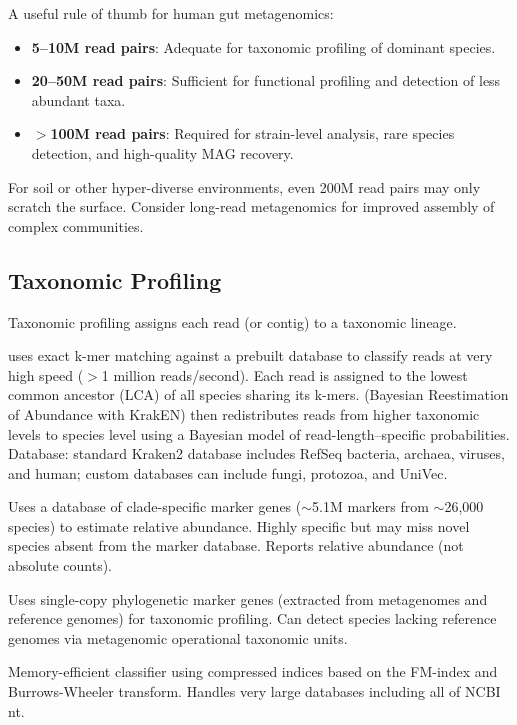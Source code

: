 \begin{tipbox}[title={Estimating Required Sequencing Depth}]
A useful rule of thumb for human gut metagenomics:
\begin{itemize}[nosep]
  \item \textbf{5--10M read pairs}: Adequate for taxonomic profiling of dominant species.
  \item \textbf{20--50M read pairs}: Sufficient for functional profiling and detection of less abundant taxa.
  \item \textbf{$>$100M read pairs}: Required for strain-level analysis, rare species detection, and high-quality MAG recovery.
\end{itemize}
For soil or other hyper-diverse environments, even 200M read pairs may only scratch the surface. Consider long-read metagenomics for improved assembly of complex communities.
\end{tipbox}

\subsection{Taxonomic Profiling}

Taxonomic profiling assigns each read (or contig) to a taxonomic lineage.

\begin{description}[style=nextline]
  \item[Kraken2 / Bracken]  uses exact k-mer matching against a prebuilt database to classify reads at very high speed ($>$1 million reads/second). Each read is assigned to the lowest common ancestor (LCA) of all species sharing its k-mers.  (Bayesian Reestimation of Abundance with KrakEN) then redistributes reads from higher taxonomic levels to species level using a Bayesian model of read-length--specific probabilities. Database: standard Kraken2 database includes RefSeq bacteria, archaea, viruses, and human; custom databases can include fungi, protozoa, and UniVec.
  \item[MetaPhlAn 4] Uses a database of clade-specific marker genes ($\sim$5.1M markers from $\sim$26,000 species) to estimate relative abundance. Highly specific but may miss novel species absent from the marker database. Reports relative abundance (not absolute counts).
  \item[mOTUs3] Uses single-copy phylogenetic marker genes (extracted from metagenomes and reference genomes) for taxonomic profiling. Can detect species lacking reference genomes via metagenomic operational taxonomic units.
  \item[Centrifuge] Memory-efficient classifier using compressed indices based on the FM-index and Burrows-Wheeler transform. Handles very large databases including all of NCBI nt.
\end{description}

